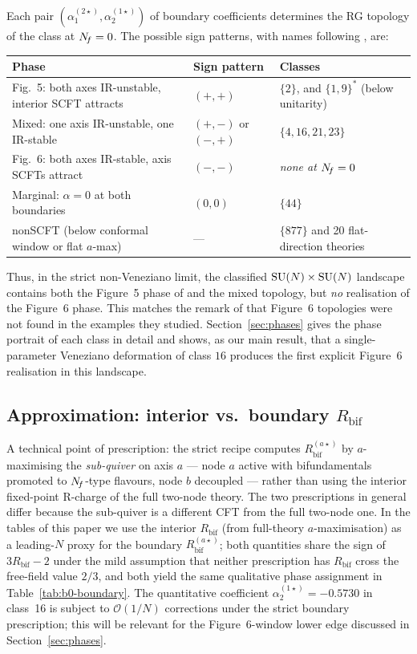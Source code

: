 Each pair $(\alpha_{1}^{(2\star)},\alpha_{2}^{(1\star)})$ of
boundary coefficients determines the RG topology of the class at
$N_{\!f}=0$.  The possible sign patterns, with names following
\cite{IW2005}, are:
\begin{center}
  \begin{tabular}{lll}
    \toprule
    Phase & Sign pattern & Classes \\
    \midrule
    Fig.~5: both axes IR-unstable, interior SCFT attracts
          & $(+,+)$      & $\{2\}$, and $\{1,9\}^{\ast}$ (below unitarity) \\
    Mixed: one axis IR-unstable, one IR-stable
          & $(+,-)$ or $(-,+)$ & $\{4,16,21,23\}$ \\
    Fig.~6: both axes IR-stable, axis SCFTs attract
          & $(-,-)$      & \emph{none at $N_{\!f}=0$} \\
    Marginal: $\alpha=0$ at both boundaries
          & $(0,0)$      & $\{44\}$ \\
    nonSCFT (below conformal window or flat $a$-max)
          & ---          & $\{877\}$ and 20 flat-direction theories \\
    \bottomrule
  \end{tabular}
\end{center}

Thus, in the strict non-Veneziano limit, the classified
$\mathrm{SU}(N)\times\mathrm{SU}(N)$ landscape contains both the Figure~5 phase of
\cite{IW2005} and the mixed topology, but \emph{no} realisation of
the Figure~6 phase.  This matches the remark of \cite{IW2005} that
Figure~6 topologies were not found in the examples they studied.
Section~\ref{sec:phases} gives the phase portrait of each class in
detail and shows, as our main result, that a single-parameter
Veneziano deformation of class $16$ produces the first explicit
Figure~6 realisation in this landscape.

\subsection{Approximation: interior vs.\ boundary
  \texorpdfstring{$R_{\text{bif}}$}{R\_bif}}
\label{sec:boundary-caveat}

A technical point of prescription: the strict \cite{IW2005} recipe
computes $R_{\text{bif}}^{(a\star)}$ by $a$-maximising the
\emph{sub-quiver} on axis $a$ — node $a$ active with bifundamentals
promoted to $N_{\!f}$-type flavours, node $b$ decoupled — rather than
using the interior fixed-point R-charge of the full two-node theory.
The two prescriptions in general differ because the sub-quiver is a
different CFT from the full two-node one.  In the tables of this
paper we use the interior $R_{\text{bif}}$ (from full-theory
$a$-maximisation) as a leading-$N$ proxy for the boundary
$R_{\text{bif}}^{(a\star)}$; both quantities share the sign of
$3R_{\text{bif}}-2$ under the mild assumption that neither
prescription has $R_{\text{bif}}$ cross the free-field value $2/3$,
and both yield the same qualitative phase assignment in
Table~\ref{tab:b0-boundary}.  The quantitative coefficient
$\alpha_{2}^{(1\star)}=-0.5730$ in class~16 is subject to
$\mathcal{O}(1/N)$ corrections under the strict boundary
prescription; this will be relevant for the Figure~6-window lower
edge discussed in Section~\ref{sec:phases}.
